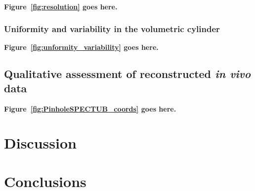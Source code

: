 \documentclass[utf8]{FrontiersinHarvard} %
\begin{document}
\noindent \textbf{Figure~\ref{fig:resolution} goes here.}


\subsubsection{Uniformity and variability in the volumetric cylinder}



\noindent \textbf{Figure~\ref{fig:unformity_variability} goes here.}


\subsection{Qualitative assessment of reconstructed \textit{in vivo} data}



\noindent \textbf{Figure~\ref{fig:PinholeSPECTUB_coords} goes here.}

\section{Discussion}


\section{Conclusions}




\end{document}
